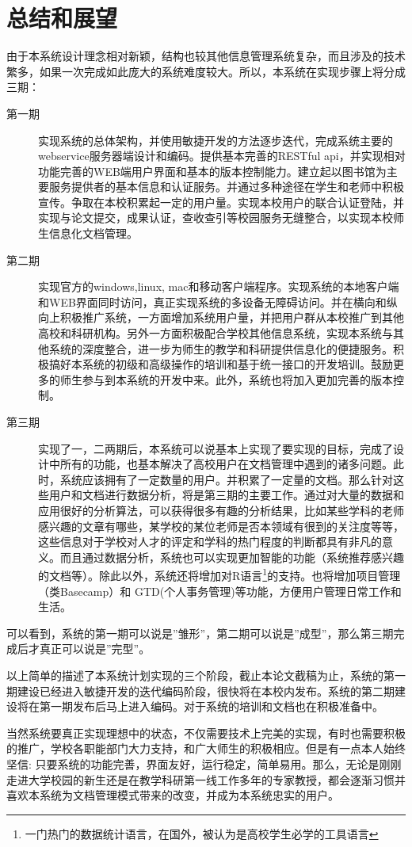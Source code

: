 
\chapter{总结和展望}
\label{chap:sumandprospect}

由于本系统设计理念相对新颖，结构也较其他信息管理系统复杂，而且涉及的技术繁多，如果一次完成如此庞大的系统难度较大。所以，本系统在实现步骤上将分成三期：
\begin{description}
\item[第一期] 实现系统的总体架构，并使用敏捷开发的方法逐步迭代，完成系统主要的webservice服务器端设计和编码。提供基本完善的RESTful api，并实现相对功能完善的WEB端用户界面和基本的版本控制能力。建立起以图书馆为主要服务提供者的基本信息和认证服务。并通过多种途径在学生和老师中积极宣传。争取在本校积累起一定的用户量。实现本校用户的联合认证登陆，并实现与论文提交，成果认证，查收查引等校园服务无缝整合，以实现本校师生信息化文档管理。
\item[第二期] 实现官方的windows,linux, mac和移动客户端程序。实现系统的本地客户端和WEB界面同时访问，真正实现系统的多设备无障碍访问。并在横向和纵向上积极推广系统，一方面增加系统用户量，并把用户群从本校推广到其他高校和科研机构。另外一方面积极配合学校其他信息系统，实现本系统与其他系统的深度整合，进一步为师生的教学和科研提供信息化的便捷服务。积极搞好本系统的初级和高级操作的培训和基于统一接口的开发培训。鼓励更多的师生参与到本系统的开发中来。此外，系统也将加入更加完善的版本控制。
\item[第三期] 实现了一，二两期后，本系统可以说基本上实现了要实现的目标，完成了设计中所有的功能，也基本解决了高校用户在文档管理中遇到的诸多问题。此时，系统应该拥有了一定数量的用户。并积累了一定量的文档。那么针对这些用户和文档进行数据分析，将是第三期的主要工作。通过对大量的数据和应用很好的分析算法，可以获得很多有趣的分析结果，比如某些学科的老师感兴趣的文章有哪些，某学校的某位老师是否本领域有很到的关注度等等，这些信息对于学校对人才的评定和学科的热门程度的判断都具有非凡的意义。而且通过数据分析，系统也可以实现更加智能的功能（系统推荐感兴趣的文档等）。除此以外，系统还将增加对R语言\footnote{一门热门的数据统计语言，在国外，被认为是高校学生必学的工具语言}的支持。也将增加项目管理（类Basecamp）和 GTD(个人事务管理)等功能，方便用户管理日常工作和生活。
\end{description}

可以看到，系统的第一期可以说是''雏形''，第二期可以说是''成型''，那么第三期完成后才真正可以说是''完型''。

以上简单的描述了本系统计划实现的三个阶段，截止本论文截稿为止，系统的第一期建设已经进入敏捷开发的迭代编码阶段，很快将在本校内发布。系统的第二期建设将在第一期发布后马上进入编码。对于系统的培训和文档也在积极准备中。

当然系统要真正实现理想中的状态，不仅需要技术上完美的实现，有时也需要积极的推广，学校各职能部门大力支持，和广大师生的积极相应。但是有一点本人始终坚信: 只要系统的功能完善，界面友好，运行稳定，简单易用。那么，无论是刚刚走进大学校园的新生还是在教学科研第一线工作多年的专家教授，都会逐渐习惯并喜欢本系统为文档管理模式带来的改变，并成为本系统忠实的用户。
